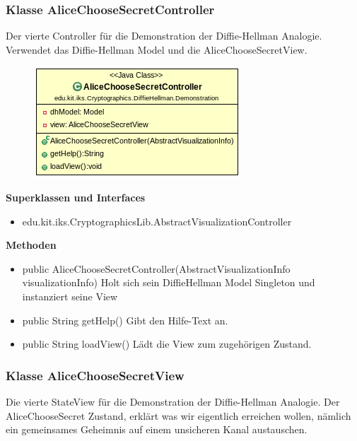 \documentclass{article}
\begin{document}
\subsubsection{Klasse AliceChooseSecretController}
      Der vierte Controller für die Demonstration der Diffie-Hellman Analogie.
      Verwendet das Diffie-Hellman Model und die AliceChooseSecretView.

      \begin{figure}[H]
        \centering
        \includegraphics{resources/edu-kit-iks-Cryptographics-DiffieHellman-Demonstration-AliceChooseSecretController}
      \end{figure}

      \textbf{Superklassen und Interfaces}
      \begin{itemize}
        \item edu.kit.iks.CryptographicsLib.AbstractVisualizationController
      \end{itemize}

      \textbf{Methoden}
      \begin{itemize}
          \item public AliceChooseSecretController(AbstractVisualizationInfo visualizationInfo) \newline
              Holt sich sein DiffieHellman Model Singleton und instanziert seine View
        \item public String getHelp() \newline
        Gibt den Hilfe-Text an.
        \item public String loadView() \newline
        Lädt die View zum zugehörigen Zustand.
      \end{itemize}

\subsubsection{Klasse AliceChooseSecretView}
      Die vierte StateView für die Demonstration der Diffie-Hellman Analogie.
      Der AliceChooseSecret Zustand, erklärt was wir eigentlich erreichen wollen,
      nämlich ein gemeinsames Geheimnis auf einem unsicheren Kanal austauschen.
\end{document}
